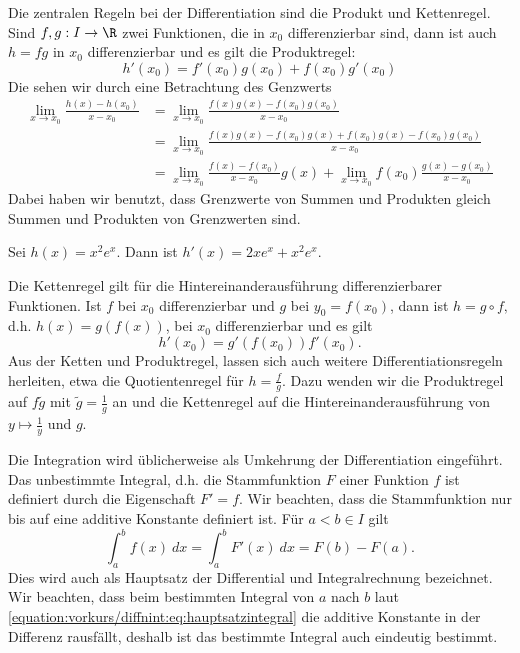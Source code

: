 \documentclass[letterpaper,10pt,english]{jupyterBook}
\begin{document}
Die zentralen Regeln bei der Differentiation sind die Produkt  und Kettenregel. Sind \(f, g:I \rightarrow \R\) zwei Funktionen, die in \(x_0\) differenzierbar sind, dann ist auch \(h = f g\) in \(x_0\) differenzierbar und es gilt die Produktregel:
\begin{equation*}
h'(x_0) = f'(x_0) g(x_0) + f(x_0) g'(x_0)\end{equation*}
Die sehen wir durch eine Betrachtung des Genzwerts
\begin{align*}
\lim_{x \rightarrow x_0} \frac{h(x) - h(x_0)}{x-x_0} &= \lim_{x \rightarrow x_0} \frac{f(x)g(x) - f(x_0)g(x_0) }{x-x_0} \\
&= \lim_{x \rightarrow x_0} \frac{f(x)g(x) - f(x_0) g(x) +f(x_0) g(x) - f(x_0)g(x_0) }{x-x_0} \\
&= \lim_{x \rightarrow x_0} \frac{f(x)  - f(x_0)   }{x-x_0} g(x)+
\lim_{x \rightarrow x_0} f(x_0) \frac{  g(x) -  g(x_0) }{x-x_0}
\end{align*}
Dabei haben wir benutzt, dass Grenzwerte von Summen und Produkten gleich Summen und Produkten von Grenzwerten sind.
\label{vorkurs/diffnint:example-2}
\begin{example}{}{}



Sei \(h(x) = x^2 e^x. \) Dann ist \(h'(x) = 2x e^x + x^2 e^x\).
\end{example}

Die Kettenregel gilt für die Hintereinanderausführung differenzierbarer Funktionen. Ist \(f\) bei \(x_0\) differenzierbar und \(g\) bei \(y_0=f(x_0)\), dann ist \(h = g \circ f, \) d.h. \(h(x) = g(f(x))\), bei \(x_0\) differenzierbar und es gilt
\begin{equation*}
 h'(x_0) = g'(f(x_0)) f'(x_0).\end{equation*}
Aus der Ketten  und Produktregel, lassen sich auch weitere Differentiationsregeln herleiten, etwa die Quotientenregel für \(h= \frac{f}g\). Dazu wenden wir die Produktregel auf \(f \tilde g\) mit \(\tilde g = \frac{1}g\) an und die Kettenregel auf die Hintereinanderausführung von \(y \mapsto \frac{1}y\) und \(g\).

Die Integration wird üblicherweise als Umkehrung der Differentiation eingeführt. Das unbestimmte Integral, d.h. die Stammfunktion \(F\) einer Funktion \(f\) ist definiert durch die Eigenschaft \(F'=f\). Wir beachten, dass die Stammfunktion nur bis auf eine additive Konstante definiert ist. Für \(a < b \in I\) gilt
\begin{equation}\label{equation:vorkurs/diffnint:eq:hauptsatzintegral}
\int_a^b f(x) ~dx = \int_a^b F'(x) ~dx = F(b) - F(a). 
\end{equation}
Dies wird auch als Hauptsatz der Differential  und Integralrechnung bezeichnet. Wir beachten, dass beim bestimmten Integral von \(a\) nach \(b\) laut \eqref{equation:vorkurs/diffnint:eq:hauptsatzintegral} die additive Konstante in der Differenz rausfällt, deshalb ist das bestimmte Integral auch eindeutig bestimmt.
\end{document}
